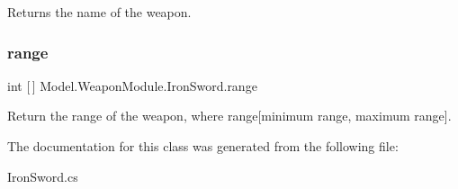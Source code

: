 Returns the name of the weapon. \hypertarget{class_model_1_1_weapon_module_1_1_iron_sword_a0d87a7bfe8e0e2350a18a79525e812d2}{}\label{class_model_1_1_weapon_module_1_1_iron_sword_a0d87a7bfe8e0e2350a18a79525e812d2} 
\subsubsection{\texorpdfstring{range}{range}}
{\footnotesize\ttfamily int \mbox{[}$\,$\mbox{]} Model.\+Weapon\+Module.\+Iron\+Sword.\+range\hspace{0.3cm}{\ttfamily [get]}}

Return the range of the weapon, where range\mbox{[}minimum range, maximum range\mbox{]}. 

The documentation for this class was generated from the following file\+:\begin{DoxyCompactItemize}
\item 
Iron\+Sword.\+cs\end{DoxyCompactItemize}
